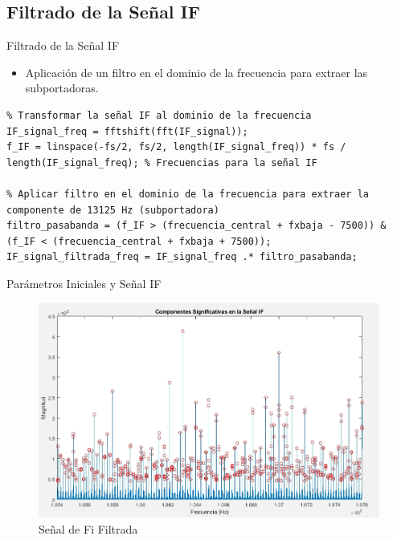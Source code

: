 \documentclass[mathserif,spanish]{beamer}
\begin{document}
\subsection{Filtrado de la Señal IF}
\begin{frame}{Filtrado de la Señal IF}
    \begin{itemize}
        \item Aplicación de un filtro en el dominio de la frecuencia para extraer las subportadoras.
    \end{itemize}
    \begin{tcolorbox}[colback=yellow!5!white, colframe=yellow!75!black, title=Filtrado de la Señal IF, fonttitle=\normalsize, fontupper=\normalsize]
\begin{lstlisting}
% Transformar la señal IF al dominio de la frecuencia
IF_signal_freq = fftshift(fft(IF_signal));
f_IF = linspace(-fs/2, fs/2, length(IF_signal_freq)) * fs / length(IF_signal_freq); % Frecuencias para la señal IF

% Aplicar filtro en el dominio de la frecuencia para extraer la componente de 13125 Hz (subportadora)
filtro_pasabanda = (f_IF > (frecuencia_central + fxbaja - 7500)) & (f_IF < (frecuencia_central + fxbaja + 7500));
IF_signal_filtrada_freq = IF_signal_freq .* filtro_pasabanda;
\end{lstlisting}
    \end{tcolorbox}
\end{frame}



\begin{frame}{Parámetros Iniciales y Señal IF}
 
    \begin{figure}[h]
        \centering
        \includegraphics[scale=0.25]{signal_107C.png}
        \caption{Señal de Fi Filtrada}
    \end{figure}
    
\end{frame}
\end{document}
